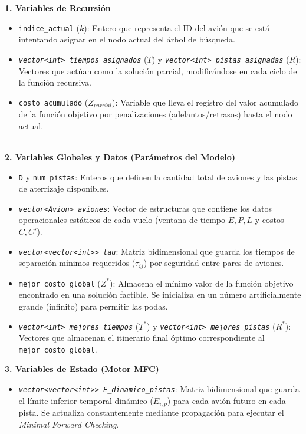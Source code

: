 \documentclass[12pt]{article}
\begin{document}
\textbf{1. Variables de Recursión}
\begin{itemize}
    \item \texttt{indice\_actual} ($k$): Entero que representa el ID del avión que se está intentando asignar en el nodo actual del árbol de búsqueda.
    \item \textit{\texttt{vector<int> tiempos\_asignados}} ($T$) y \textit{\texttt{vector<int> pistas\_asignadas}} ($R$): Vectores que actúan como la solución parcial, modificándose en cada ciclo de la función recursiva.
    \item \texttt{costo\_acumulado} ($Z_{parcial}$): Variable que lleva el registro del valor acumulado de la función objetivo por penalizaciones (adelantos/retrasos) hasta el nodo actual.
\end{itemize}\\
\textbf{2. Variables Globales y Datos (Parámetros del Modelo)}
\begin{itemize}
    \item \texttt{D} y \texttt{num\_pistas}: Enteros que definen la cantidad total de aviones y las pistas de aterrizaje disponibles.
    \item \textit{\texttt{vector\textless Avion\textgreater\ aviones}}: Vector de estructuras que contiene los datos operacionales estáticos de cada vuelo (ventana de tiempo $E, P, L$ y costos $C, C'$).
    \item \textit{\texttt{vector\textless vector\textless int\textgreater\textgreater\ tau}}: Matriz bidimensional que guarda los tiempos de separación mínimos requeridos ($\tau_{ij}$) por seguridad entre pares de aviones.
    \item \texttt{mejor\_costo\_global} ($Z^*$): Almacena el mínimo valor de la función objetivo encontrado en una solución factible. Se inicializa en un número artificialmente grande (infinito) para permitir las podas.
    \item \textit{\texttt{vector\textless int\textgreater\ mejores\_tiempos}} ($T^*$) y \textit{\texttt{vector\textless int\textgreater\ mejores\_pistas}} ($R^*$): Vectores que almacenan el itinerario final óptimo correspondiente al \texttt{mejor\_costo\_global}.
\end{itemize}
\textbf{3. Variables de Estado (Motor MFC)}
\begin{itemize}
    \item \textit{\texttt{vector\textless vector\textless int\textgreater\textgreater\ E\_dinamico\_pistas}}: Matriz bidimensional que guarda el límite inferior temporal dinámico ($E_{i,p}$) para cada avión futuro en cada pista. Se actualiza constantemente mediante propagación para ejecutar el \textit{Minimal Forward Checking}.
\end{itemize}
\end{document}
